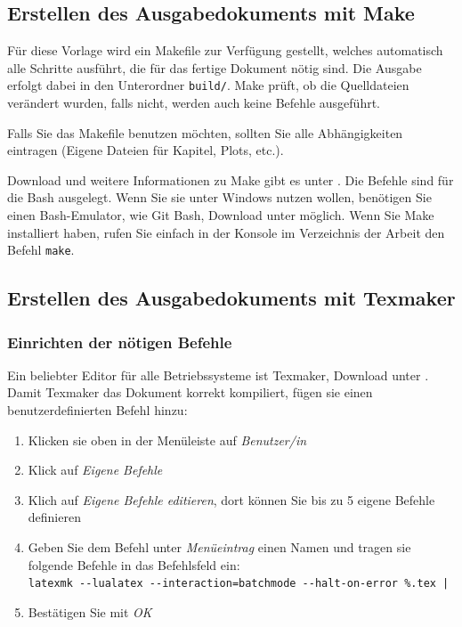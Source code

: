 \subsection{Erstellen des Ausgabedokuments mit Make}

Für diese Vorlage wird ein Makefile zur Verfügung gestellt, welches automatisch alle Schritte ausführt, die für das fertige Dokument nötig sind.
Die Ausgabe erfolgt dabei in den Unterordner \texttt{build/}.
Make prüft, ob die Quelldateien verändert wurden, falls nicht, werden auch keine Befehle ausgeführt.

Falls Sie das Makefile benutzen möchten, sollten Sie alle Abhängigkeiten eintragen (Eigene Dateien für Kapitel, Plots, etc.).


Download und weitere Informationen zu Make gibt es unter \cite{make}. Die Befehle sind für die Bash ausgelegt.
Wenn Sie sie unter Windows nutzen wollen, benötigen Sie einen Bash-Emulator, wie Git Bash, Download unter \cite{gitbash} möglich.
Wenn Sie Make installiert haben, rufen Sie einfach in der Konsole im Verzeichnis der Arbeit den Befehl \texttt{make}.

\subsection{Erstellen des Ausgabedokuments mit Texmaker}
\subsubsection{Einrichten der nötigen Befehle}
Ein beliebter Editor für alle Betriebssysteme ist Texmaker, Download unter \cite{texmaker}.
Damit Texmaker das Dokument korrekt kompiliert, fügen sie einen benutzerdefinierten Befehl hinzu:
\begin{enumerate}[nosep]
    \item Klicken sie oben in der Menüleiste auf \emph{Benutzer/in}
    \item Klick auf \emph{Eigene Befehle}
    \item Klich auf \emph{Eigene Befehle editieren}, dort können Sie bis zu 5 eigene Befehle definieren
    \item Geben Sie dem Befehl unter \emph{Menüeintrag} einen Namen und tragen sie folgende Befehle in das Befehlsfeld ein: \\
      \small\verb+latexmk --lualatex --interaction=batchmode --halt-on-error %.tex |+
    \item Bestätigen Sie mit \emph{OK}
\end{enumerate}


